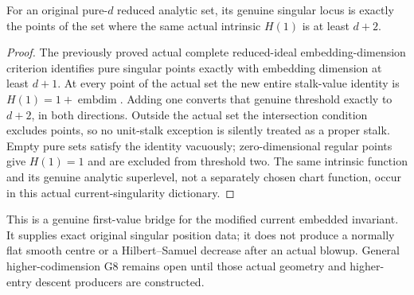 \begin{theorem}
\label{hir:actual-pure-current-singular-first-hilbert-samuel-threshold}
\leanok
{}
For an original pure-$d$ reduced analytic set, its genuine singular locus
is exactly the points of the set where the same actual intrinsic
$H(1)$ is at least $d+2$.
\end{theorem}
\begin{proof}
The previously proved actual complete reduced-ideal embedding-dimension
criterion identifies pure singular points exactly with embedding dimension
at least $d+1$. At every point of the actual set the new entire stalk-value
identity is $H(1)=1+\operatorname{embdim}$. Adding one converts that genuine
threshold exactly to $d+2$, in both directions. Outside the actual set the
intersection condition excludes points, so no unit-stalk exception is
silently treated as a proper stalk. Empty pure sets satisfy the identity
vacuously; zero-dimensional regular points give $H(1)=1$ and are excluded
from threshold two. The same intrinsic function and its genuine analytic
superlevel, not a separately chosen chart function, occur in this actual
current-singularity dictionary.
\end{proof}

\begin{remark}
This is a genuine first-value bridge for the modified current embedded
invariant. It supplies exact original singular position data; it does not
produce a normally flat smooth centre or a Hilbert--Samuel decrease after
an actual blowup. General higher-codimension G8 remains open until those
actual geometry and higher-entry descent producers are constructed.
\end{remark}
